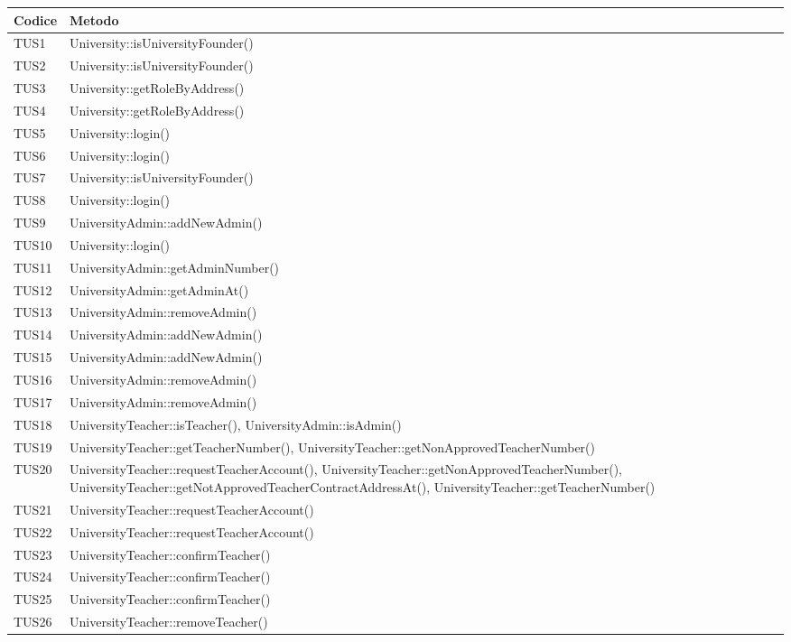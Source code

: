 \documentclass[PianoDiQualifica.tex]{subfiles}
\begin{document}
\begin{longtable}[H]{P{5cm}P{9cm}}
	\color{CHeaderText}\textbf{Codice} & 
	\color{CHeaderText}\textbf{Metodo} \\
	\endhead
	TUS1 & University::isUniversityFounder() \\ 
	TUS2 & University::isUniversityFounder() \\
	TUS3 & University::getRoleByAddress() \\
	TUS4 & University::getRoleByAddress() \\
	TUS5 & University::login() \\
	TUS6 & University::login() \\
	TUS7 & University::isUniversityFounder() \\
	TUS8 & University::login() \\
	TUS9 & UniversityAdmin::addNewAdmin() \\
	TUS10 & University::login() \\
	TUS11 & UniversityAdmin::getAdminNumber() \\
	TUS12 & UniversityAdmin::getAdminAt() \\
	TUS13 & UniversityAdmin::removeAdmin() \\
	TUS14 & UniversityAdmin::addNewAdmin() \\
	TUS15 & UniversityAdmin::addNewAdmin() \\
	TUS16 & UniversityAdmin::removeAdmin() \\
	TUS17 & UniversityAdmin::removeAdmin() \\
	TUS18 & UniversityTeacher::isTeacher(), UniversityAdmin::isAdmin() \\
	TUS19 & UniversityTeacher::getTeacherNumber(), UniversityTeacher::getNonApprovedTeacherNumber() \\
	TUS20 & UniversityTeacher::requestTeacherAccount(), UniversityTeacher::getNonApprovedTeacherNumber(), UniversityTeacher::getNotApprovedTeacherContractAddressAt(), UniversityTeacher::getTeacherNumber() \\
	TUS21 & UniversityTeacher::requestTeacherAccount() \\
	TUS22 & UniversityTeacher::requestTeacherAccount() \\
	TUS23 & UniversityTeacher::confirmTeacher() \\
	TUS24 & UniversityTeacher::confirmTeacher() \\
	TUS25 & UniversityTeacher::confirmTeacher() \\
	TUS26 & UniversityTeacher::removeTeacher() \\

\end{longtable}
\end{document}

